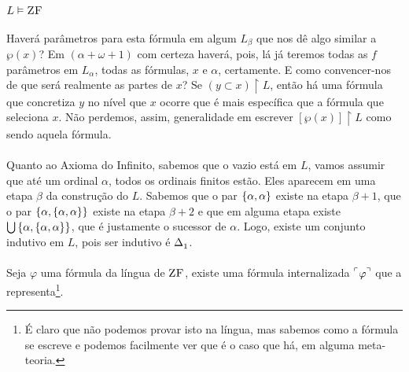 \begin{theorem}{$L\vDash\text{\sc ZF}$}
            \paragraph{}
                Haverá parâmetros para esta fórmula em algum $L_\beta$ que nos dê algo similar a $\wp(x)$? Em $(\alpha+\omega+1)$ com certeza haverá, pois, 
                lá já teremos todas as $f$ parâmetros em $L_\alpha$, todas as fórmulas, $x$ e $\alpha$, certamente. E como convencer-nos de que será realmente 
                as partes de $x$? Se $(y\subset x)\restriction L$, então há uma fórmula que concretiza $y$ no nível que $x$ ocorre que é mais específica que 
                a fórmula que seleciona $x$. Não perdemos, assim, generalidade em escrever $[\wp(x)]\restriction L$ como sendo aquela fórmula.
            \paragraph{}
                Quanto ao Axioma do Infinito, sabemos que o vazio está em $L$, vamos assumir que até um ordinal $\alpha$, todos os ordinais finitos estão. Eles
                aparecem em uma etapa $\beta$ da construção do $L$. Sabemos que o par $\SET{\alpha}{\alpha}$ existe na etapa $\beta+1$, que o par $\SET{\alpha}{\SET{\alpha}{\alpha}}$
                existe na etapa $\beta+2$ e que em alguma etapa existe $\bigcup\SET{\alpha}{\SET{\alpha}{\alpha}}$, que é justamente o sucessor de $\alpha$. Logo,
                existe um conjunto indutivo em $L$, pois ser indutivo é $\Delta^{}_{1}$. 
            \paragraph{}
                Seja $\varphi$ uma fórmula da língua de $\text{\sc ZF}$, existe uma fórmula internalizada $\FMLA{\varphi}$ que a representa\footnote{
                    É claro que não podemos provar isto na língua, mas sabemos como a fórmula se escreve e podemos facilmente ver que é o 
                    caso que há, em alguma meta-teoria.
                }.
        \end{theorem}